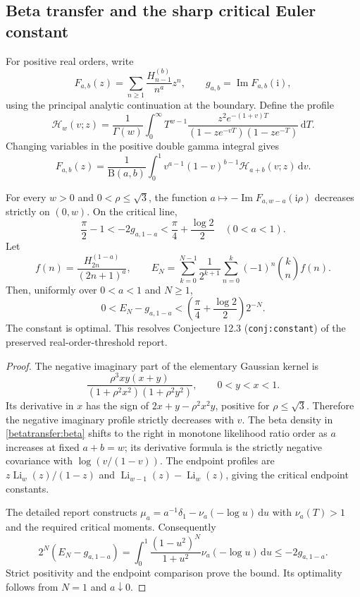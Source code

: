 \subsection{Beta transfer and the sharp critical Euler constant}
\label{betatransfer:section}

For positive real orders, write
\[
 F_{a,b}(z)=\sum_{n\ge1}\frac{H_{n-1}^{(b)}}{n^a}z^n,
 \qquad g_{a,b}=\operatorname{Im}F_{a,b}(\mathrm i),
\]
using the principal analytic continuation at the boundary. Define the
profile
\[
 \mathcal H_w(v;z)=\frac1{\Gamma(w)}\int_0^\infty
 T^{w-1}\frac{z^2e^{-(1+v)T}}
 {(1-ze^{-vT})(1-ze^{-T})}\,\mathrm dT.
\]
Changing variables in the positive double gamma integral gives
\begin{equation}\label{betatransfer:beta}
 F_{a,b}(z)=\frac1{\mathrm B(a,b)}\int_0^1
 v^{a-1}(1-v)^{b-1}\mathcal H_{a+b}(v;z)\,\mathrm dv.
\end{equation}

\begin{theorem}
\label{betatransfer:main}
For every $w>0$ and $0<\rho\le\sqrt3$, the function
$a\mapsto-\operatorname{Im}F_{a,w-a}(\mathrm i\rho)$ decreases
strictly on $(0,w)$. On the critical line,
\[
 \frac\pi2-1<-2g_{a,1-a}<\frac\pi4+\frac{\log2}{2}
 \quad(0<a<1).
\]
Let
\[
 f(n)=\frac{H_{2n}^{(1-a)}}{(2n+1)^a},\qquad
 E_N=\sum_{k=0}^{N-1}\frac1{2^{k+1}}
       \sum_{n=0}^k(-1)^n\binom kn f(n).
\]
Then, uniformly over $0<a<1$ and $N\ge1$,
\begin{equation}\label{betatransfer:criticalbound}
 0<E_N-g_{a,1-a}
 <\left(\frac\pi4+\frac{\log2}{2}\right)2^{-N}.
\end{equation}
The constant is optimal. This resolves Conjecture 12.3
(\texttt{conj:constant}) of the preserved real-order-threshold report.
\end{theorem}
\begin{proof}
The negative imaginary part of the elementary Gaussian kernel is
\[
 \frac{\rho^3xy(x+y)}{(1+\rho^2x^2)(1+\rho^2y^2)},\qquad 0<y<x<1.
\]
Its derivative in $x$ has the sign of $2x+y-\rho^2x^2y$, positive
for $\rho\le\sqrt3$. Therefore the negative imaginary profile
strictly decreases with $v$. The beta density in
\eqref{betatransfer:beta} shifts to the right in monotone likelihood
ratio order as $a$ increases at fixed $a+b=w$; its derivative formula
is the strictly negative covariance with $\log(v/(1-v))$.
The endpoint profiles are
$z\operatorname{Li}_w(z)/(1-z)$ and
$\operatorname{Li}_{w-1}(z)-\operatorname{Li}_w(z)$, giving the
critical endpoint constants.

The detailed report constructs
$\mu_a=a^{-1}\delta_1-\nu_a(-\log u)\,\mathrm du$ with
$\nu_a(T)>1$ and the required critical moments. Consequently
\[
 2^N(E_N-g_{a,1-a})
 =\int_0^1\frac{(1-u^2)^N}{1+u^2}\nu_a(-\log u)\,\mathrm du
 \le -2g_{a,1-a}.
\]
Strict positivity and the endpoint comparison prove the bound.
Its optimality follows from $N=1$ and $a\downarrow0$.
\end{proof}

